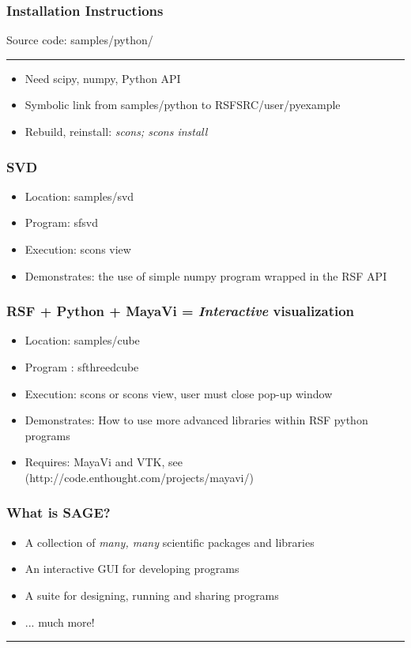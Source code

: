 \begin{frame} \frametitle{Installation Instructions}
Source code: samples/python/
\hrule
\begin{itemize}
\item Need scipy, numpy, Python API
\item Symbolic link from samples/python to RSFSRC/user/pyexample
\item Rebuild, reinstall: \emph{scons; scons install}
\end{itemize}
\end{frame}

\begin{frame} \frametitle{ SVD}
\begin{itemize}
\item Location: samples/svd
\item Program: sfsvd
\item Execution: scons view
\item Demonstrates:  the use of simple numpy program wrapped in the RSF API
\end{itemize}
\end{frame}

\begin{frame}\frametitle{RSF + Python + MayaVi = \emph{Interactive} visualization}
\begin{itemize}
\item Location: samples/cube
\item Program : sfthreedcube
\item Execution: scons or scons view, user must close pop-up window
\item Demonstrates:  How to use more advanced libraries within RSF python programs
\item Requires: MayaVi and VTK, see (http://code.enthought.com/projects/mayavi/)
\end{itemize}
\end{frame}

\begin{frame}
\end{frame}

\begin{frame} \frametitle{What is SAGE?}
\begin{itemize}
\item A collection of \emph{many, many} scientific packages and libraries
\item An interactive GUI for developing programs
\item A suite for designing, running and sharing programs
\item ... much more!
\end{itemize}
\hrule
\pause
{}
\end{frame}

